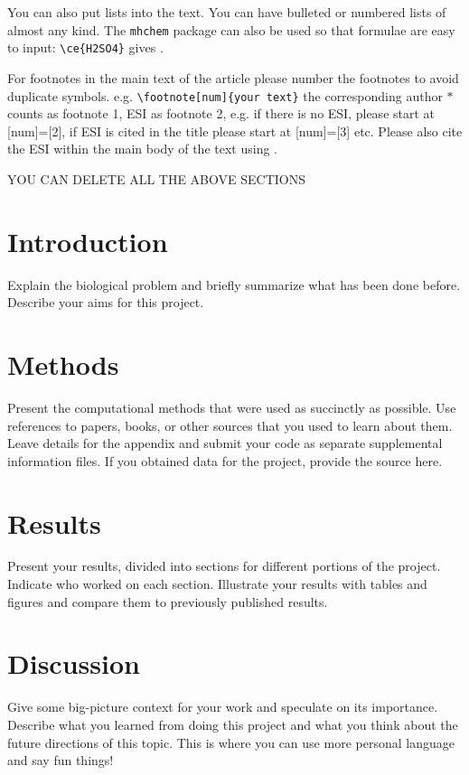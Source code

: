\documentclass[twoside,twocolumn,9pt]{article}
\begin{document}
You can also put lists into the text. You can have bulleted or numbered lists of almost any kind. 
The \texttt{mhchem} package can also be used so that formulae are easy to input: \texttt{\textbackslash ce\{H2SO4\}} gives . 

For footnotes in the main text of the article please number the footnotes to avoid duplicate symbols. e.g. \texttt{\textbackslash footnote[num]\{your text\}} the corresponding author $\ast$ counts as footnote 1, ESI as footnote 2, e.g. if there is no ESI, please start at [num]=[2], if ESI is cited in the title please start at [num]=[3] etc. Please also cite the ESI within the main body of the text using \dag.

YOU CAN DELETE ALL THE ABOVE SECTIONS

\section{Introduction}

Explain the biological problem and briefly summarize what has been done before. Describe your aims for this project.


\section{Methods}

Present the computational methods that were used as succinctly as possible. Use references to papers, books, or other sources that you used to learn about them. Leave details for the appendix and submit your code as separate supplemental information files. If you obtained data for the project, provide the source here.

\section{Results}

Present your results, divided into sections for different portions of the project. Indicate who worked on each section. Illustrate your results with tables and figures and compare them to previously published results.


\section{Discussion}

Give some big-picture context for your work and speculate on its importance. Describe what you learned from doing this project and what you think about the future directions of this topic. This is where you can use more personal language and say fun things!
\end{document}
